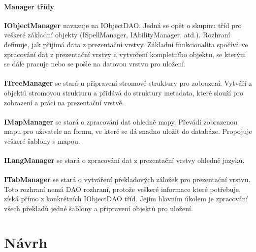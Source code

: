 \documentclass[thesis=B,czech]{resources/FITthesis}[2012/06/26]
\begin{document}
\subsubsection*{Manager třídy}
\textbf{IObjectManager} navazuje na IObjectDAO. Jedná se opět o skupinu tříd pro veškeré základní objekty (ISpellManager, IAbilityManager, atd.). Rozhraní definuje, jak přijímá data z prezentační vrstvy. Základní funkcionalita spočívá ve zpracování dat z prezentační vrstvy a vytvoření kompletního objektu, se kterým se dále pracuje nebo se pošle na datovou vrstvu pro uložení.\\
\\
\noindent\textbf{ITreeManager} se stará u připravení stromové struktury pro zobrazení. Vytváří z objektů stromovou strukturu a přidává do struktury metadata, které slouží pro zobrazení a práci na prezentační vrstvě.\\
\\
\textbf{IMapManager} se stará o zpracování dat ohledně mapy. Převádí zobrazenou mapu pro uživatele na formu, ve které se dá snadno uložit do databáze. Propojuje veškeré šablony s mapou.\\
\\
\textbf{ILangManager} se stará o zpracování dat z prezentační vrstvy ohledně jazyků.\\
\\
\textbf{ITabManager} se stará o vytváření překladových záložek pro prezentační vrstvu. Toto rozhraní nemá DAO rozhraní, protože veškeré informace které potřebuje, získá přímo z konkrétních IObjectDAO tříd. Jejím hlavním úkolem je zpracování všech překladů jedné šablony a připravení objektů pro uložení.\\





\chapter{Návrh}
\end{document}
